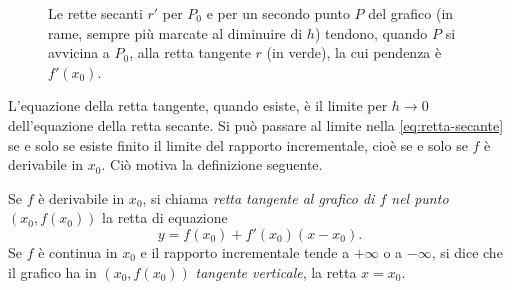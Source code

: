 \begin{figure}[htb]
\centering
{}
\caption{Le rette secanti $r'$ per $P_{0}$ e per un secondo punto $P$ del grafico (in
rame, sempre più marcate al diminuire di $h$) tendono, quando $P$ si avvicina a $P_{0}$,
alla retta tangente $r$ (in verde), la cui pendenza è $f'(x_{0})$.}
\label{fig:secanti}
\end{figure}

L'equazione della retta tangente, quando esiste, è il limite per $h\to0$ dell'equazione
della retta secante. Si può passare al limite nella \eqref{eq:retta-secante} se e solo se
esiste finito il limite del rapporto incrementale, cioè se e solo se $f$ è derivabile in
$x_{0}$. Ciò motiva la definizione seguente.

\begin{definizione}\label{def:retta-tangente}
Se $f$ è derivabile in $x_{0}$, si chiama \emph{retta tangente al grafico di $f$ nel
punto $(x_{0},f(x_{0}))$} la retta di equazione
\begin{equation}\label{eq:retta-tangente}
  y=f(x_{0})+f'(x_{0})(x-x_{0}).
\end{equation}
Se $f$ è continua in $x_{0}$ e il rapporto incrementale tende a $+\infty$ o a $-\infty$,
si dice che il grafico ha in $(x_{0},f(x_{0}))$ \emph{tangente verticale}, la retta
$x=x_{0}$.
\end{definizione}

